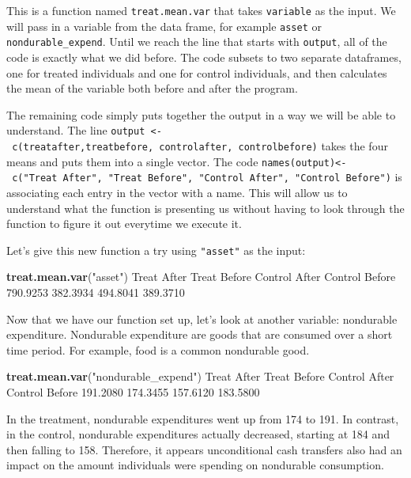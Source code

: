 \documentclass[
]{book}
\newenvironment{Shaded}{\begin{snugshade}}{\end{snugshade}}
\newcommand{\FloatTok}[1]{\textcolor[rgb]{0.00,0.00,0.81}{#1}}
\newcommand{\FunctionTok}[1]{\textcolor[rgb]{0.13,0.29,0.53}{\textbf{#1}}}
\newcommand{\NormalTok}[1]{#1}
\newcommand{\StringTok}[1]{\textcolor[rgb]{0.31,0.60,0.02}{#1}}
\begin{document}
This is a function named \texttt{treat.mean.var} that takes \texttt{variable} as the input. We will pass in a variable from the data frame, for example \texttt{asset} or \texttt{nondurable\_expend}. Until we reach the line that starts with \texttt{output}, all of the code is exactly what we did before. The code subsets to two separate dataframes, one for treated individuals and one for control individuals, and then calculates the mean of the variable both before and after the program.

The remaining code simply puts together the output in a way we will be able to understand. The line \texttt{output\ \textless{}-\ c(treatafter,treatbefore,\ controlafter,\ controlbefore)} takes the four means and puts them into a single vector. The code \texttt{names(output)\textless{}-\ c("Treat\ After",\ "Treat\ Before",\ "Control\ After",\ "Control\ Before")} is associating each entry in the vector with a name. This will allow us to understand what the function is presenting us without having to look through the function to figure it out everytime we execute it.

Let's give this new function a try using \texttt{"asset"} as the input:

\begin{Shaded}
\begin{Highlighting}[]
\FunctionTok{treat.mean.var}\NormalTok{(}\StringTok{"asset"}\NormalTok{)}
\NormalTok{   Treat After   Treat Before  Control After Control Before }
      \FloatTok{790.9253}       \FloatTok{382.3934}       \FloatTok{494.8041}       \FloatTok{389.3710} 
\end{Highlighting}
\end{Shaded}

Now that we have our function set up, let's look at another variable: nondurable expenditure. Nondurable expenditure are goods that are consumed over a short time period. For example, food is a common nondurable good.

\begin{Shaded}
\begin{Highlighting}[]
\FunctionTok{treat.mean.var}\NormalTok{(}\StringTok{"nondurable\_expend"}\NormalTok{)}
\NormalTok{   Treat After   Treat Before  Control After Control Before }
      \FloatTok{191.2080}       \FloatTok{174.3455}       \FloatTok{157.6120}       \FloatTok{183.5800} 
\end{Highlighting}
\end{Shaded}

In the treatment, nondurable expenditures went up from 174 to 191. In contrast, in the control, nondurable expenditures actually decreased, starting at 184 and then falling to 158. Therefore, it appears unconditional cash transfers also had an impact on the amount individuals were spending on nondurable consumption.
\end{document}
